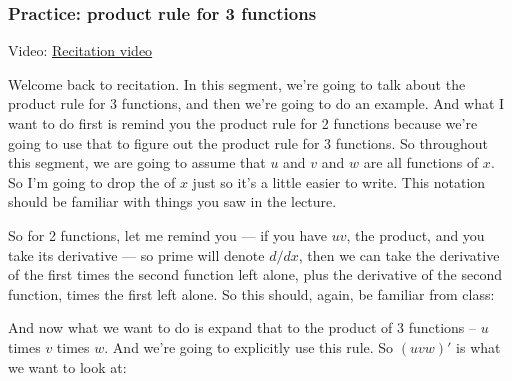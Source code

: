 \documentclass[pdftex, brazil, 12pt, twoside]{article}
\begin{document}
\subsubsection{Practice: product rule for 3 functions}
\label{u2-product-rule-practice}

Video: \href{https://www.youtube.com/watch?v=\_R5fOYaSk0s}{Recitation video}

Welcome back to recitation.
In this segment, we're going to talk about the product
rule for 3 functions, and then we're going to do an example.
And what I want to do first is remind
you the product rule for 2 functions
because we're going to use that to figure out the product
rule for 3 functions.
So throughout this segment, we are
going to assume that $u$ and $v$ and $w$ are all functions of $x$.
So I'm going to drop the of $x$ just so it's
a little easier to write.
This notation should be familiar with things
you saw in the lecture.

So for 2 functions, let me remind you ---
if you have $uv$, the product, and you
take its derivative --- so prime will denote $d/dx$,
then we can take the derivative of the first times
the second function left alone, plus the derivative
of the second function, times the first left alone.
So this should, again, be familiar from class:

\begin{figure}[H]
  \begin{center}
  \end{center}
\end{figure}

And now what we want to do is expand that to the product of 3
functions -- $u$ times $v$ times $w$.
And we're going to explicitly use this rule.
So $(uvw)'$ is what we want to look at:
\end{document}
